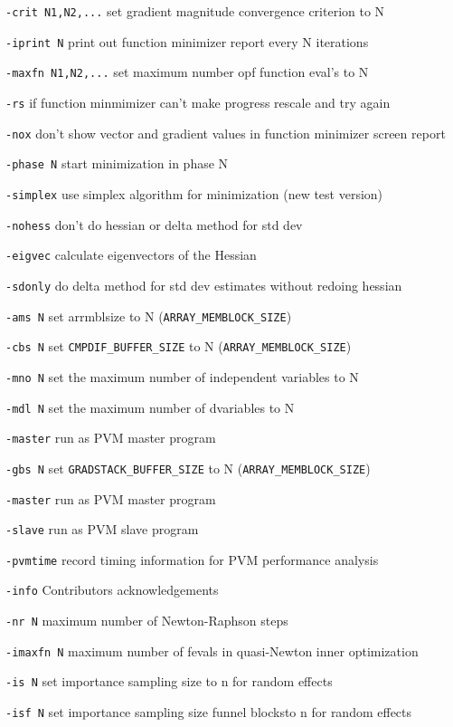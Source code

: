 \documentclass[a4paper,10pt,notumble]{leaflet}
\begin{document}
{\verb|-crit N1,N2,...| set gradient magnitude convergence criterion to N

\verb|-iprint N|       print out function minimizer report every N iterations

\verb|-maxfn N1,N2,...| set maximum number opf function eval's to N

\verb|-rs|             if function minmimizer can't make progress rescale and try again

\verb|-nox|            don't show vector and gradient values in function minimizer screen report

\verb|-phase N|        start minimization in phase N

\verb|-simplex|        use simplex algorithm for minimization (new test version)

\verb|-nohess|         don't do hessian or delta method for std dev

\verb|-eigvec|         calculate eigenvectors of the Hessian

\verb|-sdonly|         do delta method for std dev estimates without redoing hessian

\verb|-ams N|          set arrmblsize to N (\verb|ARRAY_MEMBLOCK_SIZE|)

\verb|-cbs N|          set \verb|CMPDIF_BUFFER_SIZE| to N (\verb|ARRAY_MEMBLOCK_SIZE|)

\verb|-mno N|          set the maximum number of independent variables to N

\verb|-mdl N|          set the maximum number of dvariables to N

\verb|-master|         run as PVM master program

\verb|-gbs N|          set \verb|GRADSTACK_BUFFER_SIZE| to N (\verb|ARRAY_MEMBLOCK_SIZE|)

\verb|-master|         run as PVM master program

\verb|-slave|          run as PVM slave program

\verb|-pvmtime|        record timing information for PVM performance analysis

\verb|-info|           Contributors acknowledgements

\verb|-nr N|           maximum number of Newton-Raphson steps

\verb|-imaxfn N|       maximum number of fevals in quasi-Newton inner optimization

\verb|-is N|           set importance sampling size to n for random effects

\verb|-isf N|          set importance sampling size funnel blocksto n for random effects

}
\end{document}
